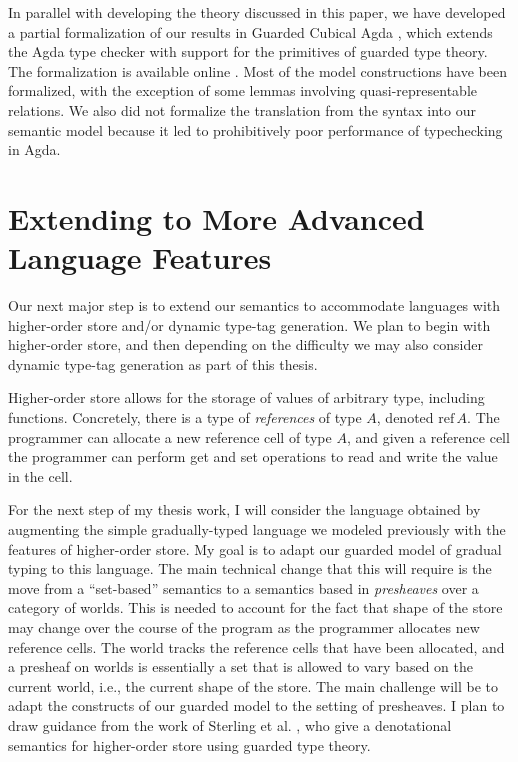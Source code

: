 \documentclass{article}
\theoremstyle{definition}
\theoremstyle{remark}
\newcommand{\tref}{\text{ref}}
\begin{document}
In parallel with developing the theory discussed in this paper, we have
developed a partial formalization of our results in Guarded Cubical Agda
\cite{veltri-vezzosi2020}, which extends the Agda type checker with support for
the primitives of guarded type theory. The formalization is available online
\cite{artifact}. Most of the model constructions have been formalized, with the
exception of some lemmas involving quasi-representable relations. We also did
not formalize the translation from the syntax into our semantic model because it
led to prohibitively poor performance of typechecking in Agda.



\section{Extending to More Advanced Language Features}\label{sec:remaining-work}

Our next major step is to extend our semantics to accommodate languages
with higher-order store and/or dynamic type-tag generation.
%
We plan to begin with higher-order store, and then depending on the difficulty
we may also consider dynamic type-tag generation as part of this thesis.

Higher-order store allows for the storage of values of arbitrary type, including
functions. Concretely, there is a type of \emph{references} of type $A$, denoted
$\tref\, A$. The programmer can allocate a new reference cell of type $A$, and
given a reference cell the programmer can perform get and set operations to read
and write the value in the cell.

For the next step of my thesis work, I will consider the language obtained by
augmenting the simple gradually-typed language we modeled previously with the
features of higher-order store. My goal is to adapt our guarded model of gradual
typing to this language. The main technical change that this will require is the
move from a ``set-based'' semantics to a semantics based in \emph{presheaves}
over a category of worlds. This is needed to account for the fact that shape of
the store may change over the course of the program as the programmer allocates
new reference cells. The world tracks the reference cells that have been
allocated, and a presheaf on worlds is essentially a set that is allowed to vary
based on the current world, i.e., the current shape of the store.
%
The main challenge will be to adapt the constructs of our guarded model to the
setting of presheaves. I plan to draw guidance from the work of Sterling et al.
\cite{DBLP:journals/corr/abs-2210-02169}, who give a denotational semantics for
higher-order store using guarded type theory.
\end{document}
